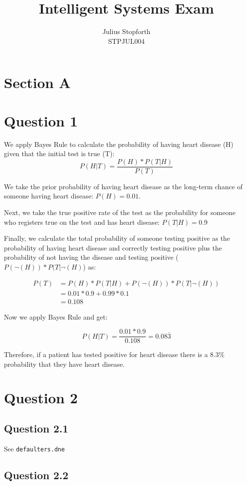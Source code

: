 \documentclass[12pt,notitlepage]{article}
\newcommand{\question}{\section*}
\begin{document}
\title{Intelligent Systems Exam} \author{Julius Stopforth \\ STPJUL004}
\maketitle

\section*{Section A}
\question{Question 1}

We apply Bayes Rule to calculate the probability of having heart disease (H)
given that the initial test is true (T): $$P(H|T) = \frac{P(H)*P(T|H)}{P(T)}$$

We take the prior probability of having heart disease as the long-term
chance of someone having heart disease: $P(H) = 0.01$.

Next, we take the true positive rate of the test as the probability for someone
who registers true on the test and has heart disease: $P(T|H) = 0.9$

Finally, we calculate the total probability of someone testing positive as the
probability of having heart disease and correctly testing positive plus the
probability of not having the disease and testing positive
($P(\neg(H))*P(T|\neg(H)$) as:

\begin{align*}
 P(T) &= P(H)*P(T|H) + P(\neg(H))*P(T|\neg(H)) \\
 &= 0.01*0.9 + 0.99*0.1 \\
 &= 0.108
\end{align*}

Now we apply Bayes Rule and get:

    $$P(H|T) = \frac{0.01*0.9}{0.108} = 0.08\overline{3} $$


Therefore, if a patient has tested positive for heart disease there is a 8.3\%
probability that they have heart disease.

\pagebreak

\question{Question 2}

\subsection*{Question 2.1}

See \texttt{defaulters.dne}

\subsection*{Question 2.2}
\end{document}
